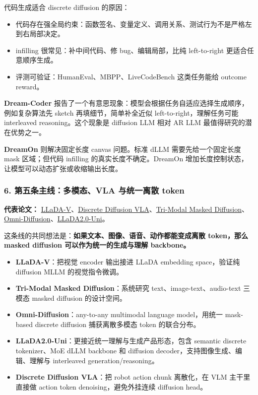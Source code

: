 代码生成适合 discrete diffusion 的原因：

\begin{itemize}[leftmargin=1.5em]
  \item 代码存在强全局约束：函数签名、变量定义、调用关系、测试行为不是严格左到右局部决定。
  \item infilling 很常见：补中间代码、修 bug、编辑局部，比纯 left-to-right 更适合任意顺序生成。
  \item 评测可验证：HumanEval、MBPP、LiveCodeBench 这类任务能给 outcome reward。
\end{itemize}

\textbf{Dream-Coder} 报告了一个有意思现象：模型会根据任务自适应选择生成顺序，例如复杂算法先 sketch 再填细节，简单补全近似 left-to-right，理解任务可能 interleaved reasoning。这个现象是 diffusion LLM 相对 AR LLM 最值得研究的潜在优势之一。

\textbf{DreamOn} 则解决固定长度 canvas 问题。标准 dLLM 需要先给一个固定长度 mask 区域；但代码 infilling 的真实长度不确定。DreamOn 增加长度控制状态，让模型可以动态扩张或收缩输出长度。

\subsubsection{6. 第五条主线：多模态、VLA 与统一离散 token}

\textbf{代表论文：} \href{https://arxiv.org/abs/2505.16933}{LLaDA-V}、\href{https://arxiv.org/abs/2508.20072}{Discrete Diffusion VLA}、\href{https://arxiv.org/abs/2602.21472}{Tri-Modal Masked Diffusion}、\href{https://arxiv.org/abs/2603.06577}{Omni-Diffusion}、\href{https://arxiv.org/abs/2604.20796}{LLaDA2.0-Uni}。

这条线的共同想法是：\textbf{如果文本、图像、语音、动作都能变成离散 token，那么 masked diffusion 可以作为统一的生成与理解 backbone。}

\begin{itemize}[leftmargin=1.5em]
  \item \textbf{LLaDA-V}：把视觉 encoder 输出接进 LLaDA embedding space，验证纯 diffusion MLLM 的视觉指令微调。
  \item \textbf{Tri-Modal Masked Diffusion}：系统研究 text、image-text、audio-text 三模态 masked diffusion 的设计空间。
  \item \textbf{Omni-Diffusion}：any-to-any multimodal language model，用统一 mask-based discrete diffusion 捕获离散多模态 token 的联合分布。
  \item \textbf{LLaDA2.0-Uni}：更接近统一理解与生成产品形态，包含 semantic discrete tokenizer、MoE dLLM backbone 和 diffusion decoder，支持图像生成、编辑、理解与 interleaved generation/reasoning。
  \item \textbf{Discrete Diffusion VLA}：把 robot action chunk 离散化，在 VLM 主干里直接做 action token denoising，避免外挂连续 diffusion head。
\end{itemize}


